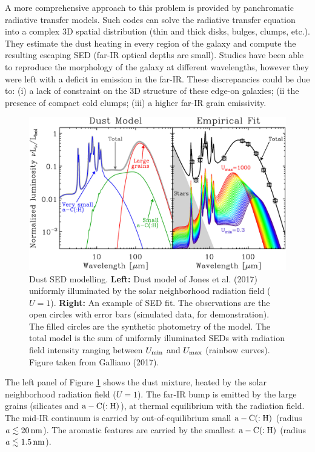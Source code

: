 \documentclass[a4paper,10pt]{article}
\begin{document}
{\noindent}A more comprehensive approach to this problem is provided by panchromatic radiative transfer models. Such codes can solve the radiative transfer equation into a complex 3D spatial distribution (thin and thick disks, bulges, clumps, etc.). They estimate the dust heating in every region of the galaxy and compute the resulting escaping SED (far-IR optical depths are small). Studies have been able to reproduce the morphology of the galaxy at different wavelengths, however they were left with a deficit in emission in the far-IR. These discrepancies could be due to: (i) a lack of constraint on the 3D structure of these edge-on galaxies; (ii the presence of compact cold clumps; (iii) a higher far-IR grain emissivity.

\begin{figure}[t]
    \centering
    \includegraphics[width=14cm]{figures/GalaxySED_model.jpg}
    \caption{\footnotesize{Dust SED modelling. \textbf{Left:} Dust model of Jones et al. (2017) uniformly illuminated by the solar neighborhood radiation field ($U=1$). \textbf{Right:} An example of SED fit. The observations are the open circles with error bars (simulated data, for demonstration). The filled circles are the synthetic photometry of the model. The total model is the sum of uniformly illuminated SEDs with radiation field intensity ranging between $U_{\rm min}$ and $U_{\rm max}$ (rainbow curves). Figure taken from Galliano (2017).}}
    \label{fig:dustpah}
\end{figure}

{\noindent}The left panel of Figure \ref{fig:dustpah} shows the dust mixture, heated by the solar neighborhood radiation field ($U=1$). The far-IR bump is emitted by the large grains (silicates and ${\rm a-C(:H)}$), at thermal equilibrium with the radiation field. The mid-IR continuum is carried by out-of-equilibrium small ${\rm a-C(:H)}$ (radius  $a\lesssim20\,{\rm nm}$). The aromatic features are carried by the smallest ${\rm a-C(:H)}$ (radius $a\lesssim1.5\,{\rm nm}$).
\end{document}
